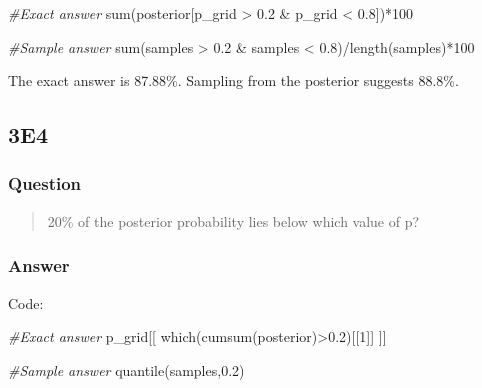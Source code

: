 \documentclass[
]{book}
\newenvironment{Shaded}{\begin{snugshade}}{\end{snugshade}}
\newcommand{\CommentTok}[1]{\textcolor[rgb]{0.56,0.35,0.01}{\textit{#1}}}
\newcommand{\DecValTok}[1]{\textcolor[rgb]{0.00,0.00,0.81}{#1}}
\newcommand{\FloatTok}[1]{\textcolor[rgb]{0.00,0.00,0.81}{#1}}
\newcommand{\FunctionTok}[1]{\textcolor[rgb]{0.00,0.00,0.00}{#1}}
\newcommand{\NormalTok}[1]{#1}
\newcommand{\SpecialCharTok}[1]{\textcolor[rgb]{0.00,0.00,0.00}{#1}}
\begin{document}
\begin{Shaded}
\begin{Highlighting}[]
\CommentTok{\#Exact answer}
\FunctionTok{sum}\NormalTok{(posterior[p\_grid }\SpecialCharTok{\textgreater{}} \FloatTok{0.2} \SpecialCharTok{\&}\NormalTok{ p\_grid }\SpecialCharTok{\textless{}} \FloatTok{0.8}\NormalTok{])}\SpecialCharTok{*}\DecValTok{100}

\CommentTok{\#Sample answer}
\FunctionTok{sum}\NormalTok{(samples }\SpecialCharTok{\textgreater{}} \FloatTok{0.2} \SpecialCharTok{\&}\NormalTok{ samples }\SpecialCharTok{\textless{}} \FloatTok{0.8}\NormalTok{)}\SpecialCharTok{/}\FunctionTok{length}\NormalTok{(samples)}\SpecialCharTok{*}\DecValTok{100}
\end{Highlighting}
\end{Shaded}

The exact answer is 87.88\%. Sampling from the posterior suggests 88.8\%.

\hypertarget{e4-1}{%
\subsection*{3E4}\label{e4-1}}

\hypertarget{question-18}{%
\subsubsection*{Question}\label{question-18}}

\begin{quote}
20\% of the posterior probability lies below which value of p?
\end{quote}

\hypertarget{answer-18}{%
\subsubsection*{Answer}\label{answer-18}}

Code:

\begin{Shaded}
\begin{Highlighting}[]
\CommentTok{\#Exact answer}
\NormalTok{p\_grid[[}
  \FunctionTok{which}\NormalTok{(}\FunctionTok{cumsum}\NormalTok{(posterior)}\SpecialCharTok{\textgreater{}}\FloatTok{0.2}\NormalTok{)[[}\DecValTok{1}\NormalTok{]]}
\NormalTok{  ]]}

\CommentTok{\#Sample answer}
\FunctionTok{quantile}\NormalTok{(samples,}\FloatTok{0.2}\NormalTok{)}
\end{Highlighting}
\end{Shaded}
\end{document}
